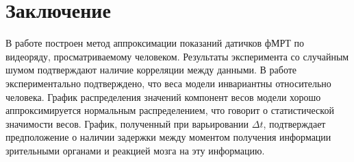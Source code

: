 \documentclass[12pt,twoside]{article}
\begin{document}
\section{Заключение}
В работе построен метод аппроксимации показаний датичков фМРТ по видеоряду, просматриваемому человеком. 
Результаты эксперимента со случайным шумом подтверждают наличие корреляции между данными.
В работе экспериментально подтверждено, что веса модели инвариантны относительно человека. 
График распределения значений компонент весов модели хорошо аппроксимируется нормальным распределением, что говорит о статистической значимости весов.
График, полученный при варьировании $\Delta t$, подтверждает предположение о наличии задержки между моментом получения информации зрительными органами и реакцией мозга на эту информацию.

 
\newpage






\end{document}
